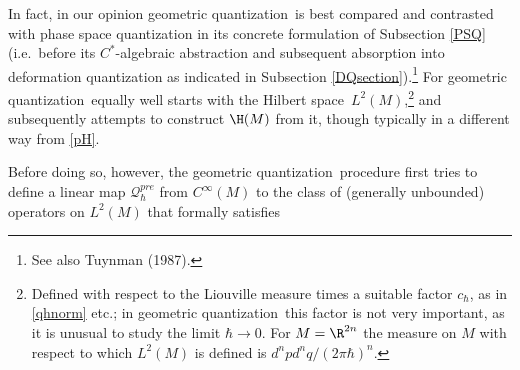 \documentclass[12pt,titlepage]{article}
\newcommand{\ca}{$C^*$-algebra} \newcommand{\jba}{JB-algebra}
\newcommand{\Hs}{Hilbert space} \newcommand{\Bs}{Banach space}
\newcommand{\raw}{\rightarrow} \newcommand{\rat}{\mapsto}
\newcommand{\cin}{C^{\infty}} \newcommand{\cci}{C^{\infty}_c}
\newcommand{\qp}{\CQ_{\hbar}^{\mbox{\tiny pos}}}
\newcommand{\er}{\eqref}
\newcommand{\CQ}{{\mathcal Q}} \newcommand{\CR}{{\mathcal R}}
\renewcommand{\qp}{\CQ^{pre}_{\hbar}}
\newcommand{\gq}{geometric quantization}
\begin{document}
In fact, in our opinion \gq\ is best compared and contrasted with phase space quantization in its concrete formulation of Subsection \ref{PSQ} (i.e.\ before its \ca ic abstraction and subsequent absorption into deformation quantization as indicated in Subsection \ref{DQsection}).\footnote{See also Tuynman (1987).} For \gq\ equally well starts with the \Hs\ $L^2(M)$,\footnote{Defined with respect to the Liouville measure times a suitable factor $c_{\hbar}$, as in \er{qhnorm} etc.;  in \gq\ this factor is not very important, as it is unusual to study the limit $\hbar\raw 0$. For $M=\R^{2n}$ the measure on $M$ with respect to which $L^2(M)$ is defined is $d^npd^nq/(2\pi\hbar)^n$.
} and subsequently attempts to construct $\H(M)$ from it, though typically in a different way from \er{pH}. 

Before doing so, however, the \gq\ procedure first tries to define a linear map $\qp$ from $\cin(M)$ to the class of (generally unbounded) operators on $L^2(M)$ that formally satisfies 
\end{document}
